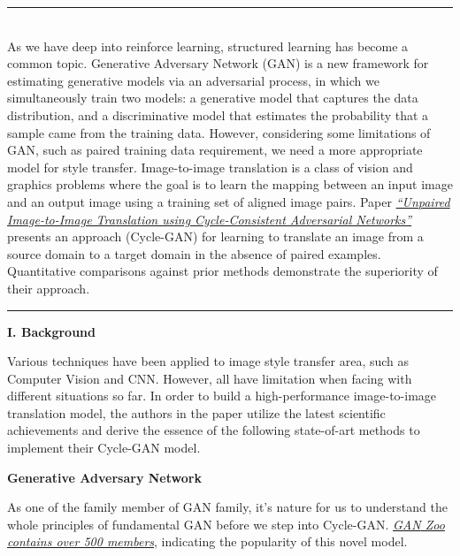 \documentclass[a4paper]{article}
\newcommand{\HRule}{\rule{\linewidth}{0.5mm}}
\begin{document}
\noindent \HRule
\vspace{2.5mm} \\
\large{As we have deep into reinforce learning, structured learning has become a common topic. Generative Adversary Network (\textsf{GAN}) is a new framework for estimating generative models via an adversarial process, in which we simultaneously train two models: a generative model that captures the data distribution, and a discriminative model that estimates the probability that a sample came from the training data. However, considering some limitations of \textsf{GAN}, such as paired training data requirement, we need a more appropriate model for style transfer. Image-to-image translation is a class of vision and graphics problems where the goal is to learn the mapping between an input image and an output image using a training set of aligned image pairs. Paper \href{https://arxiv.org/pdf/1703.10593.pdf}{\emph{``Unpaired Image-to-Image Translation using Cycle-Consistent Adversarial Networks''}} presents an approach (\textsf{Cycle-GAN}) for learning to translate an image from a source domain to a target domain in the absence of paired examples. Quantitative comparisons against prior methods demonstrate the superiority of their approach.}
\vspace{2mm} \\
\HRule

\vspace{6mm}
\begin{center}
\LARGE\textbf{I. Background} \\
\end{center}
\vspace{2mm}

\large{Various techniques have been applied to image style transfer area, such as Computer Vision and CNN. However, all have limitation when facing with different situations so far. In order to build a high-performance image-to-image translation model, the authors in the paper utilize the latest scientific achievements and derive the essence of the following state-of-art methods to implement their \textsf{Cycle-GAN} model. }

\begin{center}
\large\textbf{Generative Adversary Network} \\
\end{center}

\large
As one of the family member of \textsf{GAN} family, it's nature for us to understand the whole principles of fundamental \textsf{GAN} before we step into \textsf{Cycle-GAN}. \href{https://github.com/hindupuravinash/the-gan-zoo}{\emph{\textsf{GAN} Zoo contains over 500 members}}, indicating the popularity of this novel model. 
\end{document}
